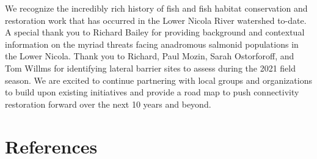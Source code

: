 \documentclass[
  letterpaper,
  DIV=11,
  numbers=noendperiod]{scrreprt}
\begin{document}
We recognize the incredibly rich history of fish and fish habitat
conservation and restoration work that has occurred in the Lower Nicola
River watershed to-date. A special thank you to Richard Bailey for
providing background and contextual information on the myriad threats
facing anadromous salmonid populations in the Lower Nicola. Thank you to
Richard, Paul Mozin, Sarah Ostorforoff, and Tom Willms for identifying
lateral barrier sites to assess during the 2021 field season. We are
excited to continue partnering with local groups and organizations to
build upon existing initiatives and provide a road map to push
connectivity restoration forward over the next 10 years and beyond.

\hypertarget{references}{%
\section*{References}\label{references}}

\end{document}
